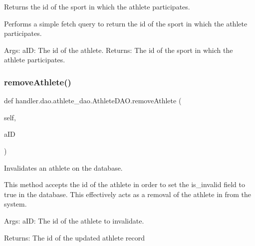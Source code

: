 \begin{DoxyVerb}Returns the id of the sport in which the 
athlete participates.

Performs a simple fetch query to return the id
of the sport in which the athlete participates.

Args:
    aID: The id of the athlete.
Returns:
    The id of the sport in which the athlete
    participates.
\end{DoxyVerb}
 \mbox{\label{classhandler_1_1dao_1_1athlete__dao_1_1_athlete_d_a_o_a2677d09a6586e6742190c81270dc408a}} 
\subsubsection{\texorpdfstring{remove\+Athlete()}{removeAthlete()}}
{\footnotesize\ttfamily def handler.\+dao.\+athlete\+\_\+dao.\+Athlete\+D\+A\+O.\+remove\+Athlete (\begin{DoxyParamCaption}\item[{}]{self,  }\item[{}]{a\+ID }\end{DoxyParamCaption})}

\begin{DoxyVerb}Invalidates an athlete on the database.

This method accepts the id of the athlete in order
to set the is_invalid field to true in the database.
This effectively acts as a removal of the athlete in 
from the system.

Args:
    aID: The id of the athlete to invalidate.

Returns:
    The id of the updated athlete record
\end{DoxyVerb}
 \mbox{\label{classhandler_1_1dao_1_1athlete__dao_1_1_athlete_d_a_o_acf5929b8fe16451d4dad25146d93e426}} 
